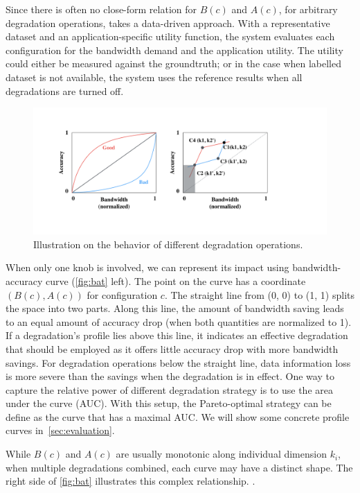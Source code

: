 Since there is often no close-form relation for $B(c)$ and $A(c)$, for arbitrary
degradation operations, \sysname{} takes a data-driven approach. With a
representative dataset and an application-specific utility function, the system
evaluates each configuration for the bandwidth demand and the application
utility. The utility could either be measured against the groundtruth; or in the
case when labelled dataset is not available, the system uses the reference
results when all degradations are turned off.

\begin{figure}
  \centering
  \includegraphics[width=\columnwidth]{figures/degrade.pdf}
  \caption{Illustration on the behavior of different degradation operations.}
  \label{fig:bat}
\end{figure}

When only one knob is involved, we can represent its impact using
bandwidth-accuracy curve (\autoref{fig:bat} left). The point on the curve has a
coordinate $(B(c), A(c))$ for configuration $c$. The straight line from (0, 0)
to (1, 1) splits the space into two parts. Along this line, the amount of
bandwidth saving leads to an equal amount of accuracy drop (when both quantities
are normalized to 1). If a degradation's profile lies above this line, it
indicates an effective degradation that should be employed as it offers little
accuracy drop with more bandwidth savings. For degradation operations below the
straight line, data information loss is more severe than the savings when the
degradation is in effect. One way to capture the relative power of different
degradation strategy is to use the area under the curve (AUC). With this setup,
the Pareto-optimal strategy can be define as the curve that has a maximal AUC.
We will show some concrete profile curves in~\autoref{sec:evaluation}.

While $B(c)$ and $A(c)$ are usually monotonic along individual dimension $k_i$,
when multiple degradations combined, each curve may have a distinct shape. The
right side of \autoref{fig:bat} illustrates this complex
relationship. .


